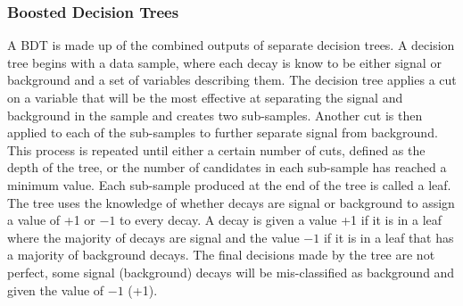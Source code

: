 \subsubsection{Boosted Decision Trees}
\label{sec:GeneralBDT}
A BDT is made up of the combined outputs of separate decision trees. A decision tree begins with a data sample, where each decay is know to be either signal or background and a set of variables describing them. The decision tree applies a cut on a variable that will be the most effective at separating the signal and background in the sample and creates two sub-samples. Another cut is then applied to each of the sub-samples to further separate signal from background. This process is repeated until either a certain number of cuts, defined as the depth of the tree, or the number of candidates in each sub-sample has reached a minimum value. Each sub-sample produced at the end of the tree is called a leaf. The tree uses the knowledge of whether decays are signal or background to assign a value of +1 or $-1$ to every decay. A decay is given a value +1 if it is in a leaf where the majority of decays are signal and the value $-1$ if it is in a leaf that has a majority of background decays. The final decisions made by the tree are not perfect, some signal (background) decays will be mis-classified as background and given the value of $-1$ (+1). %

